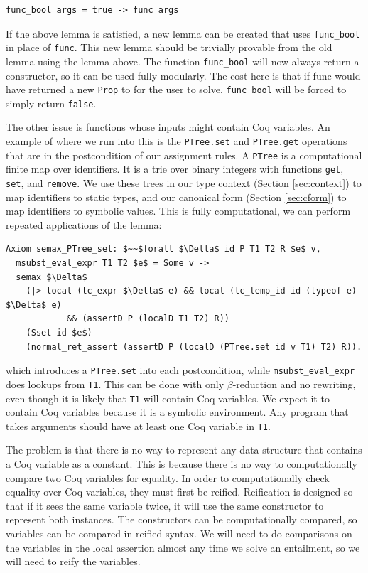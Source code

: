 \documentclass{puthesis}
\begin{document}
\begin{lstlisting}
func_bool args = true -> func args
\end{lstlisting}

If the above lemma is satisfied, a new lemma can be created that uses
\lstinline|func_bool| in place of \lstinline|func|. This new lemma
should be trivially provable from the old lemma using the lemma
above. The function \lstinline|func_bool| will now always return a
constructor, so it can be used fully modularly. The cost here is that
if func would have returned a new \lstinline|Prop| to for the user to
solve, \lstinline|func_bool| will be forced to simply return \lstinline|false|.

The other issue is functions whose inputs might contain Coq
variables. An example of where we run into this is the
\lstinline|PTree.set| and \lstinline|PTree.get| operations that are in
the postcondition of our assignment rules. A \lstinline|PTree| is a
computational finite map over identifiers. It is a trie over binary
integers with functions \lstinline|get|, \lstinline|set|, and
\lstinline|remove|. We use these trees in our type context (Section
\ref{sec:context}) to map identifiers to static types, and our
canonical form (Section \ref{sec:cform}) to map identifiers to
symbolic values. This is fully computational, we can perform repeated
applications of the lemma:

\begin{lstlisting}
Axiom semax_PTree_set: $~~$forall $\Delta$ id P T1 T2 R $e$ v,
  msubst_eval_expr T1 T2 $e$ = Some v ->
  semax $\Delta$
    (|> local (tc_expr $\Delta$ e) && local (tc_temp_id id (typeof e) $\Delta$ e) 
            && (assertD P (localD T1 T2) R))
    (Sset id $e$)
    (normal_ret_assert (assertD P (localD (PTree.set id v T1) T2) R)).
\end{lstlisting}

which introduces a \lstinline|PTree.set| into each postcondition,
while \lstinline|msubst_eval_expr| does lookups from
\lstinline|T1|. This can be done with only $\beta$-reduction and no
rewriting, even though it is likely that \lstinline|T1| will contain
Coq variables. We expect it to contain Coq variables because it is a
symbolic environment. Any program that takes arguments should have at
least one Coq variable in \lstinline|T1|.

The problem is that there is no way to represent any data structure
that contains a Coq variable as a constant. This is because there is
no way to computationally compare two Coq variables for equality. In
order to computationally check equality over Coq variables, they must
first be reified.  Reification is designed so that if it sees the same
variable twice, it will use the same constructor to represent both
instances. The constructors can be computationally compared, so
variables can be compared in reified syntax.  We will need to do
comparisons on the variables in the local assertion almost any time we
solve an entailment, so we will need to reify the variables.
\end{document}
